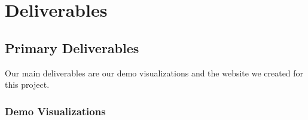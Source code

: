 \documentclass[paper=a4, fontsize=11pt]{report} %
\begin{document}
\chapter{Deliverables} %
\label{cha:deliverables}

\section{Primary Deliverables} %
\label{sec:primary_deliverables}

Our main deliverables are our demo visualizations and the website we created for this project.

\subsection{Demo Visualizations} %
\label{sub:demo_visualizations}
\end{document}
